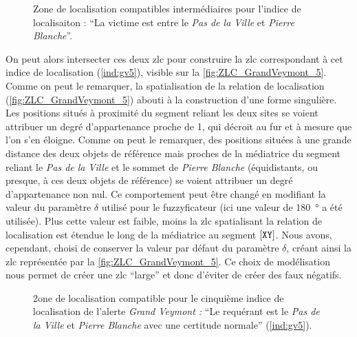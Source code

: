 \begin{figure}
    \caption{Zone de localisation compatibles intermédiaires pour
      l'indice de localisaiton : \enquote{La victime est entre le
        \emph{Pas de la Ville} et \emph{Pierre Blanche}}.}
  \label{fig:Entre_GrandVeymont_RSA}
\end{figure}

On peut alors intersecter ces deux \ac{zlc} pour construire la
\ac{zlc} correspondant à cet indice de localisation (\ref{ind:gv5}),
visible sur la \autoref{fig:ZLC_GrandVeymont_5}. Comme on peut le
remarquer, la spatialisation de la relation de localisation
 (\autoref{fig:ZLC_GrandVeymont_5}) abouti
à la construction d'une forme singulière. Les positions situés à
proximité du segment reliant les deux sites se voient attribuer un
degré d'appartenance proche de 1, qui décroit au fur et à mesure que
l'on s'en éloigne. Comme on peut le remarquer, des positions situées à
une grande distance des deux objets de référence mais proches de la
médiatrice du segment reliant le \emph{Pas de la Ville} et le sommet
de \emph{Pierre Blanche} (\ie équidistants, ou presque, à ces deux
objets de référence) se voient attribuer un degré d'appartenance non
nul. Ce comportement peut être changé en modifiant la valeur du
paramètre \(\delta\) utilisé pour le fuzzyficateur
 (ici une valeur de \SI{180}{\degree} a été
utilisée). Plus cette valeur est faible, moins la \ac{zlc}
spatialisant la relation de localisation 
est étendue le long de la médiatrice au segment
$[\text{\texttt{XY}}]$. Nous avons, cependant, choisi de conserver la
valeur par défaut du paramètre \(\delta\), créant ainsi la \ac{zlc}
représentée par la \autoref{fig:ZLC_GrandVeymont_5}. Ce choix de
modélisation nous permet de créer une \ac{zlc} \enquote{large} et donc
d'éviter de créer des faux négatifs.

\begin{figure}
  \centering
  
  \caption{2one de localisation compatible pour le cinquième indice de
    localisation de l'alerte \emph{Grand Veymont :} \enquote{Le
      requérant est \protect{} le \emph{Pas
        de la Ville} et \emph{Pierre Blanche} avec une certitude
      normale} (\ref{ind:gv5}).}
  \label{fig:ZLC_GrandVeymont_5}
\end{figure}


